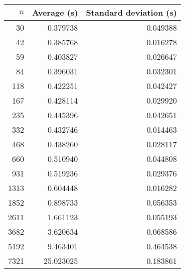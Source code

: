 \begin{tabular}{rrr}
$n$ & Average (s) & Standard deviation (s)\\\hline
30 & 0.379738 & 0.049388\\
42 & 0.385768 & 0.016278\\
59 & 0.403827 & 0.026647\\
84 & 0.396031 & 0.032301\\
118 & 0.422251 & 0.042427\\
167 & 0.428114 & 0.029920\\
235 & 0.445396 & 0.042651\\
332 & 0.432746 & 0.014463\\
468 & 0.438260 & 0.028117\\
660 & 0.510940 & 0.044808\\
931 & 0.519236 & 0.029376\\
1313 & 0.604448 & 0.016282\\
1852 & 0.898733 & 0.056353\\
2611 & 1.661123 & 0.055193\\
3682 & 3.620634 & 0.068586\\
5192 & 9.463401 & 0.464538\\
7321 & 25.023025 & 0.183861\\
\end{tabular}
